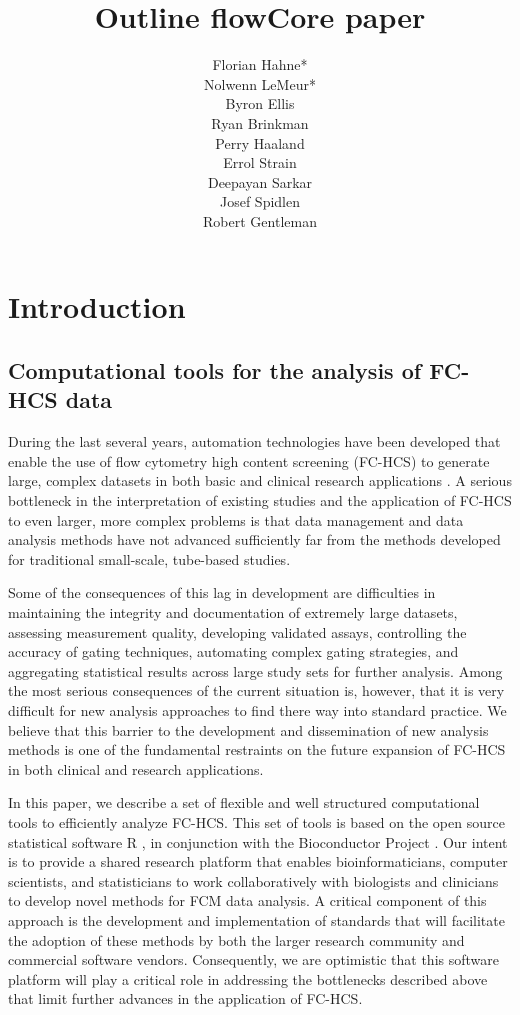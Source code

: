 \documentclass[12pt]{article}
\title{Outline flowCore paper}
\author{Florian Hahne*\\
  Nolwenn LeMeur*\\
  Byron Ellis\\
  Ryan Brinkman\\
  Perry Haaland\\
  Errol Strain\\
  Deepayan Sarkar\\
  Josef Spidlen\\
  Robert Gentleman
 }
\begin{document}
\maketitle

\section*{Introduction}
\subsection*{Computational tools for the analysis of FC-HCS data}
During the last several years, automation technologies have been
developed that enable the use of flow cytometry high content screening
(FC-HCS) to generate large, complex datasets in both basic and
clinical research applications \citep{brinkman2007hcf}. A serious
bottleneck in the interpretation of existing studies and the
application of FC-HCS to even larger, more complex problems is that
data management and data analysis methods have not advanced
sufficiently far from the methods developed for traditional
small-scale, tube-based studies.

Some of the consequences of this lag in development are difficulties
in maintaining the integrity and documentation of extremely large
datasets, assessing measurement quality, developing validated assays,
controlling the accuracy of gating techniques, automating complex gating
strategies, and aggregating statistical results across large study
sets for further analysis.  Among the most serious consequences of the
current situation is, however, that it is very difficult for new
analysis approaches to find there way into standard practice. We
believe that this barrier to the development and dissemination of new
analysis methods is one of the fundamental restraints on the future
expansion of FC-HCS in both clinical and research applications.

In this paper, we describe a set of flexible and well structured
computational tools to efficiently analyze FC-HCS. This set of tools
is based on the open source statistical software R \citep{Rmain}, in
conjunction with the Bioconductor Project \citep{BIOC}. Our intent is
to provide a shared research platform that enables bioinformaticians,
computer scientists, and statisticians to work collaboratively with
biologists and clinicians to develop novel methods  
\citep{lizard2007fca} for FCM data analysis. A critical component of
this approach is the development and implementation of standards that
will facilitate the adoption of these methods by both the larger
research community and commercial software vendors.  Consequently, we
are optimistic that this software platform will play a critical role
in addressing the bottlenecks described above that limit further
advances in the application of FC-HCS.
\end{document}
